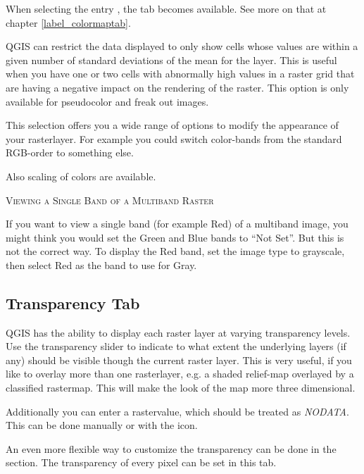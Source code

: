 When selecting the entry , the tab
 becomes available. See more on that at chapter
\ref{label_colormaptab}.

QGIS can restrict the data displayed to only show cells whose values are
within a given number of standard deviations of the mean for the
layer. This is useful when you have 
one or two cells with abnormally high values in a raster grid that are having 
a negative impact on the rendering of the raster. This option is only available
for pseudocolor and freak out images.


This selection offers you a wide range of options to modify the appearance
of your rasterlayer. For example you could switch color-bands from the
standard RGB-order to something else.

Also scaling of colors are available.

\begin{Tip}\caption{\textsc{Viewing a Single Band of a Multiband Raster}}
If you want to view a single band (for example Red) of a multiband
image, you might think you would set the Green and Blue bands to ``Not
Set''. But this is not the correct way. To display the Red band,
set the image type to grayscale, then select Red as the band to use for Gray.
\end{Tip}

\subsection{Transparency Tab} \label{rastertab:transparency}

QGIS has the ability to display each raster layer at varying transparency
levels. Use the transparency slider to indicate to what extent the underlying layers (if any) should be visible though the current raster layer.
This is very useful, if you like to overlay more than one rasterlayer, e.g. a shaded relief-map overlayed by a classified rastermap. This will make the look of the map more three dimensional.

Additionally you can enter a rastervalue, which should be treated as
{\em NODATA}. This can be done manually or with the 
 icon.

An even more flexible way to customize the transparency can be done in the
 section.
The transparency of every pixel can be set in this tab.

